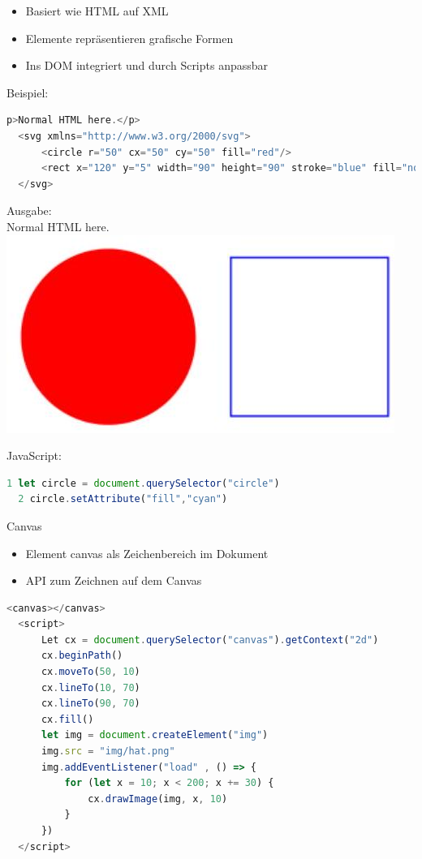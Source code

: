   \begin{itemize}
    \item Basiert wie HTML auf XML
    \item Elemente repräsentieren grafische Formen
    \item Ins DOM integriert und durch Scripts anpassbar
  \end{itemize}
  
  Beispiel:
  
  \begin{lstlisting}[language=JavaScript, style=basesmol]
  p>Normal HTML here.</p>
  <svg xmlns="http://www.w3.org/2000/svg">
      <circle r="50" cx="50" cy="50" fill="red"/>
      <rect x="120" y="5" width="90" height="90" stroke="blue" fill="none"/>
  </svg>
  \end{lstlisting}
  
  Ausgabe:\\
  Normal HTML here.\\
  \includegraphics[width=\linewidth]{images/2024_12_29_858f09cde51177c71657g-27}
  
  JavaScript:
  
  \begin{lstlisting}[language=JavaScript, style=basesmol]
  1 let circle = document.querySelector("circle")
  2 circle.setAttribute("fill","cyan")
  \end{lstlisting}
  
  \begin{definition}{Canvas}
  \begin{itemize}
    \item Element canvas als Zeichenbereich im Dokument
    \item API zum Zeichnen auf dem Canvas
  \end{itemize}
  
  \begin{lstlisting}[language=JavaScript, style=basesmol]
  <canvas></canvas>
  <script>
      Let cx = document.querySelector("canvas").getContext("2d")
      cx.beginPath()
      cx.moveTo(50, 10)
      cx.lineTo(10, 70)
      cx.lineTo(90, 70)
      cx.fill()
      let img = document.createElement("img")
      img.src = "img/hat.png"
      img.addEventListener("load" , () => {
          for (let x = 10; x < 200; x += 30) {
              cx.drawImage(img, x, 10)
          }
      })
  </script>
  \end{lstlisting}
\end{definition}
  
